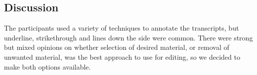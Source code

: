 






\subsection{Discussion}
The participants used a variety of techniques to annotate the transcripts, but underline, strikethrough and lines down
the side were common. There were strong but mixed opinions on whether selection of desired material, or removal of
unwanted material, was the best approach to use for editing, so we decided to make both options available.

